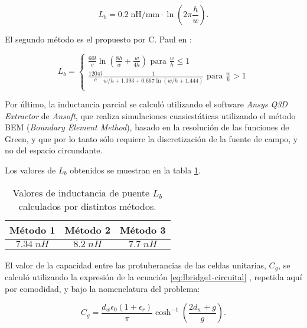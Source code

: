 \begin{equation}
\label{eq:lbridge1-circuital}
L_{b} = 0.2\; \text{nH/mm} \cdot \ln \left(2\pi \frac{h}{w}\right).
\end{equation}

El segundo método es el propuesto por C. Paul en \cite{CPaul:InductanceLoopAndPartial}:

\begin{equation}
\label{eq:lbridge2-circuital-cpaul}
L_{b} = \begin{cases}
			\frac{60 l}{c} \ln \left( \frac{8h}{w} + \frac{w}{4h} \right) \text{ para } \frac{w}{h}\leq 1\\
			\frac{120 \pi l}{c} \frac{1}{w/h+1.393+0.667\ln(w/h+1.444)} \text{ para } \frac{w}{h} > 1 \\
		\end{cases}
\end{equation}

Por último, la inductancia parcial se calculó utilizando el software \textit{Ansys Q3D Extractor} de \textit{Ansoft}, que realiza simulaciones cuasiestáticas utilizando el método BEM (\textit{Boundary Element Method}), basado en la resolución de las funciones de Green, y que por lo tanto sólo requiere la discretización de la fuente de campo, y no del espacio circundante.

Los valores de $L_b$ obtenidos se muestran en la tabla \ref{table:Lb}.

\begin{table}[H]
	\centering
	\begin{tabular}{|c|c|c|}
		\hline 
		Método 1 & Método 2 & Método 3\\ 
		\hline 
		$7.34\;nH$ & $8.2\;nH$ & $7.7\;nH$\\ 
		\hline 
	\end{tabular}
	\caption{Valores de inductancia de puente $L_b$ calculados por distintos métodos.}
	\label{table:Lb}
\end{table}

El valor de la capacidad entre las protuberancias de las celdas unitarias, $C_g$, se calculó utilizando la expresión de la ecuación \ref{eq:lbridge1-circuital} \cite{CPaul:InductanceLoopAndPartial}, repetida aquí por comodidad, y bajo la nomenclatura del problema:

\begin{equation}
\label{eq:cgap1-circuital}
C_{g} = \frac{d_w\epsilon_0(1+\epsilon_r)}{\pi}\cosh^{-1}\left(\frac{2 d_w + g}{g}\right).
\end{equation}

